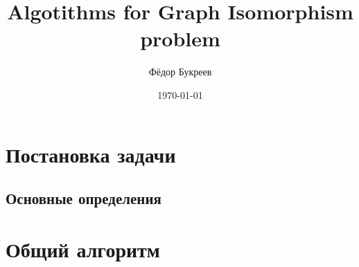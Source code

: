 \documentclass[fleqn]{article}
\title{Algotithms for Graph Isomorphism problem}
\author{Фёдор Букреев}
\date{\today}
\begin{document}
\maketitle
\tableofcontents

\section{Постановка задачи}
\subsection{Основные определения}



\section{Общий алгоритм}


\end{document}
